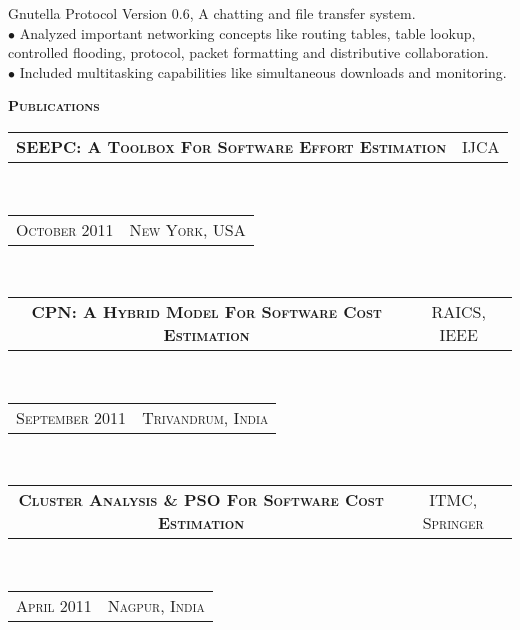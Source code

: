 \documentclass[10pt,letterpaper,oneside]{article}
\begin{document}
\begin{minipage}[t]{0.63\textwidth}
\begin{adjustwidth}{7pt}{0pt}
{            Gnutella Protocol Version 0.6, A chatting and file transfer
            system.\\
            $\bullet$ Analyzed important networking concepts like routing tables, table lookup, controlled
            flooding, protocol, packet formatting and distributive
            collaboration.\\
            $\bullet$ Included multitasking capabilities like simultaneous
            downloads and monitoring.}\\
        \end{adjustwidth}
        \textcolor{light-gray}{\textbf{\large P\textsc{ublications}}}
        \vspace{10pt}\\
        \begin{tabular}{c|c}
            \textbf{\normalsize SEEPC: A T\textsc{oolbox}
            F\textsc{or} S\textsc{oftware} E\textsc{ffort}
        E\textsc{stimation}}
            &\textmd{\normalsize IJCA}
        \end{tabular}\\
        \textcolor{light-gray}{
            \begin{tabular}{c|c}
                {\small O\textsc{ctober 2011}}
                &{\small N\textsc{ew} Y\textsc{ork}, USA}
            \end{tabular}
        \vspace{10pt}
        }\\ 
        \begin{tabular}{c|c}
            \textbf{\normalsize CPN: A H\textsc{ybrid}
            M\textsc{odel} F\textsc{or} S\textsc{oftware}
        C\textsc{ost} E\textsc{stimation}}
            &\textmd{\normalsize RAICS, IEEE}
        \end{tabular}\\
        \textcolor{light-gray}{
            \begin{tabular}{c|c}
                {\small S\textsc{eptember 2011}}
                &{\small T\textsc{rivandrum}, I\textsc{ndia}}
            \end{tabular}
            \vspace{10pt}
        }\\ 
        \begin{tabular}{c|c}
            \textbf{\normalsize C\textsc{luster} A\textsc{nalysis} \& PSO F\textsc{or} S\textsc{oftware} C\textsc{ost} E\textsc{stimation}}
            &\textmd{\normalsize ITMC, S\textsc{pringer}}
        \end{tabular}\\
        \textcolor{light-gray}{
            \begin{tabular}{c|c}
                {\small A\textsc{pril 2011}}
                &{\small N\textsc{agpur}, I\textsc{ndia}}
            \end{tabular}
        }\\ 
    \end{minipage}
\end{document}
